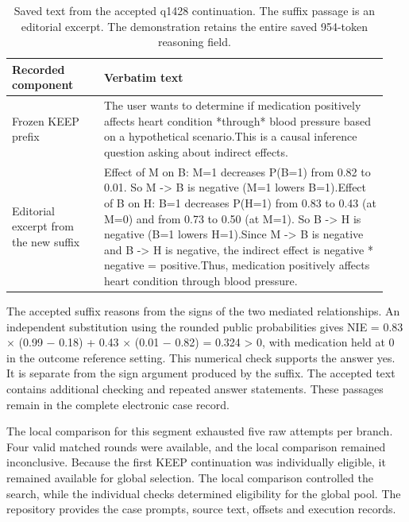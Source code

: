 \begin{table}[htbp]
\centering
\begingroup
\setlength{\tabcolsep}{2pt}
\begin{tabular}{@{}>{\raggedright\arraybackslash}p{0.23\linewidth}>{\raggedright\arraybackslash}p{0.71\linewidth}@{}}
\toprule
\textbf{Recorded component} & \textbf{Verbatim text} \\
\midrule
Frozen KEEP prefix & The user wants to determine if medication positively affects heart condition *through* blood pressure based on a hypothetical scenario.\newline This is a causal inference question asking about indirect effects.\newline  \\
Editorial excerpt from the new suffix & Effect of M on B: M=1 decreases P(B=1) from 0.82 to 0.01. So M -\textgreater{} B is negative (M=1 lowers B=1).\newline Effect of B on H: B=1 decreases P(H=1) from 0.83 to 0.43 (at M=0) and from 0.73 to 0.50 (at M=1). So B -\textgreater{} H is negative (B=1 lowers H=1).\newline Since M -\textgreater{} B is negative and B -\textgreater{} H is negative, the indirect effect is negative * negative = positive.\newline Thus, medication positively affects heart condition through blood pressure. \\
\bottomrule
\end{tabular}
\endgroup
\caption[Saved text from the accepted q1428 continuation]{Saved text from the accepted q1428 continuation. The suffix passage is an editorial excerpt. The demonstration retains the entire saved 954-token reasoning field.}\label{tab:3.1}
\end{table}

The accepted suffix reasons from the signs of the two mediated relationships. An independent substitution using the rounded public probabilities gives NIE = 0.83 \ensuremath{\times} (0.99 \ensuremath{-} 0.18) + 0.43 \ensuremath{\times} (0.01 \ensuremath{-} 0.82) = 0.324 \textgreater{} 0, with medication held at 0 in the outcome reference setting. This numerical check supports the answer yes. It is separate from the sign argument produced by the suffix. The accepted text contains additional checking and repeated answer statements. These passages remain in the complete electronic case record.

The local comparison for this segment exhausted five raw attempts per branch. Four valid matched rounds were available, and the local comparison remained inconclusive. Because the first KEEP continuation was individually eligible, it remained available for global selection. The local comparison controlled the search, while the individual checks determined eligibility for the global pool. The repository provides the case prompts, source text, offsets and execution records.

